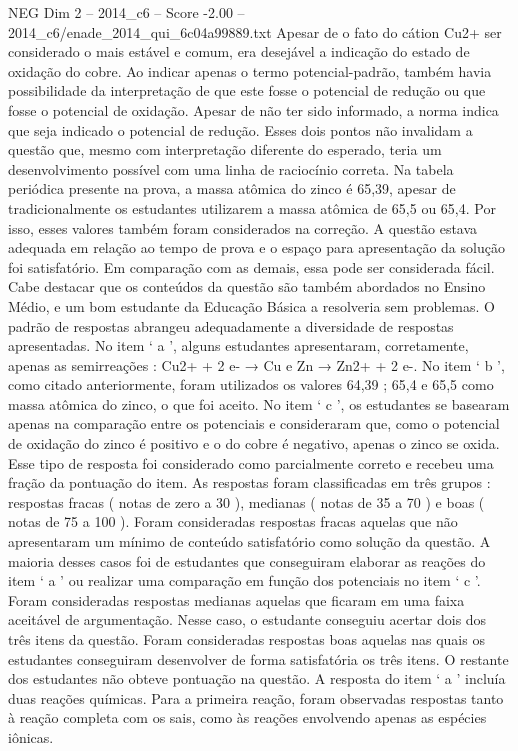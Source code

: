 \begin{textsample}{NEG Dim 2 – 2014\_c6 – Score -2.00 – 2014\_c6/enade\_2014\_qui\_6c04a99889.txt}
Apesar de o fato do cátion Cu2+ ser considerado o mais estável e comum, era desejável a indicação do estado de oxidação do cobre.
Ao indicar apenas o termo potencial-padrão, também havia possibilidade da interpretação de que este fosse o potencial de redução ou que fosse o potencial de oxidação.
Apesar de não ter sido informado, a norma indica que seja indicado o potencial de redução.
Esses dois pontos não invalidam a questão que, mesmo com interpretação diferente do esperado, teria um desenvolvimento possível com uma linha de raciocínio correta.
Na tabela periódica presente na prova, a massa atômica do zinco é 65,39, apesar de tradicionalmente os estudantes utilizarem a massa atômica de 65,5 ou 65,4.
Por isso, esses valores também foram considerados na correção.
A questão estava adequada em relação ao tempo de prova e o espaço para apresentação da solução foi satisfatório.
Em comparação com as demais, essa pode ser considerada fácil.
Cabe destacar que os conteúdos da questão são também abordados no Ensino Médio, e um bom estudante da Educação Básica a resolveria sem problemas.
O padrão de respostas abrangeu adequadamente a diversidade de respostas apresentadas.
No item ‘ a ’, alguns estudantes apresentaram, corretamente, apenas as semirreações : Cu2+ + 2 e- → Cu e Zn → Zn2+ + 2 e-.
No item ‘ b ’, como citado anteriormente, foram utilizados os valores 64,39 ; 65,4 e 65,5 como massa atômica do zinco, o que foi aceito.
No item ‘ c ’, os estudantes se basearam apenas na comparação entre os potenciais e consideraram que, como o potencial de oxidação do zinco é positivo e o do cobre é negativo, apenas o zinco se oxida.
Esse tipo de resposta foi considerado como parcialmente correto e recebeu uma fração da pontuação do item.
As respostas foram classificadas em três grupos : respostas fracas ( notas de zero a 30 ), medianas ( notas de 35 a 70 ) e boas ( notas de 75 a 100 ).
Foram consideradas respostas fracas aquelas que não apresentaram um mínimo de conteúdo satisfatório como solução da questão.
A maioria desses casos foi de estudantes que conseguiram elaborar as reações do item ‘ a ’ ou realizar uma comparação em função dos potenciais no item ‘ c ’.
Foram consideradas respostas medianas aquelas que ficaram em uma faixa aceitável de argumentação.
Nesse caso, o estudante conseguiu acertar dois dos três itens da questão.
Foram consideradas respostas boas aquelas nas quais os estudantes conseguiram desenvolver de forma satisfatória os três itens.
O restante dos estudantes não obteve pontuação na questão.
A resposta do item ‘ a ’ incluía duas reações químicas.
Para a primeira reação, foram observadas respostas tanto à reação completa com os sais, como às reações envolvendo apenas as espécies iônicas.

\end{textsample}
